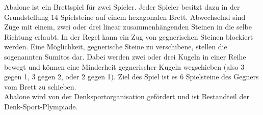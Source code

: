 Abalone ist ein Brettspiel für zwei Spieler. Jeder Spieler besitzt dazu in der 
Grundstellung 14 Spielsteine auf einem hexagonalen Brett. Abwechselnd sind Züge mit einem, zwei oder drei linear
zusammenhängenden Steinen in die selbe Richtung erlaubt. In der Regel kann ein Zug
von gegnerischen Steinen blockiert werden. Eine Möglichkeit, gegnerische Steine
zu verschibene, stellen die sogenannten Sumitos dar. Dabei werden zwei oder drei 
Kugeln in einer Reihe bewegt und können eine Minderheit gegnerischer Kugeln
wegschieben (also 3 gegen 1, 3 gegen 2, oder 2 gegen 1). Ziel des Spiel ist es 6 Spielsteine
des Gegners vom Brett zu schieben.\\
Abalone wird von der Denksportorganisation gefördert und ist Bestandteil der 
Denk-Sport-Plympiade.
